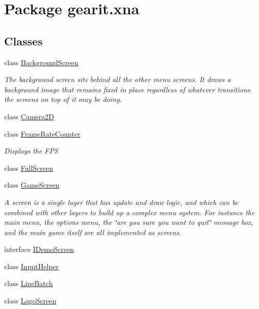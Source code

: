 \hypertarget{namespacegearit_1_1xna}{\section{Package gearit.\+xna}
\label{namespacegearit_1_1xna}
}
\subsection*{Classes}
\begin{DoxyCompactItemize}
\item 
class \hyperlink{classgearit_1_1xna_1_1_background_screen}{Background\+Screen}
\begin{DoxyCompactList}\small\item\em The background screen sits behind all the other menu screens. It draws a background image that remains fixed in place regardless of whatever transitions the screens on top of it may be doing. \end{DoxyCompactList}\item 
class \hyperlink{classgearit_1_1xna_1_1_camera2_d}{Camera2\+D}
\item 
class \hyperlink{classgearit_1_1xna_1_1_frame_rate_counter}{Frame\+Rate\+Counter}
\begin{DoxyCompactList}\small\item\em Displays the F\+P\+S \end{DoxyCompactList}\item 
class \hyperlink{classgearit_1_1xna_1_1_full_screen}{Full\+Screen}
\item 
class \hyperlink{classgearit_1_1xna_1_1_game_screen}{Game\+Screen}
\begin{DoxyCompactList}\small\item\em A screen is a single layer that has update and draw logic, and which can be combined with other layers to build up a complex menu system. For instance the main menu, the options menu, the \char`\"{}are you sure you
want to quit\char`\"{} message box, and the main game itself are all implemented as screens. \end{DoxyCompactList}\item 
interface \hyperlink{interfacegearit_1_1xna_1_1_i_demo_screen}{I\+Demo\+Screen}
\item 
class \hyperlink{classgearit_1_1xna_1_1_input_helper}{Input\+Helper}
\item 
class \hyperlink{classgearit_1_1xna_1_1_line_batch}{Line\+Batch}
\item 
class \hyperlink{classgearit_1_1xna_1_1_logo_screen}{Logo\+Screen}

\end{DoxyCompactItemize}

